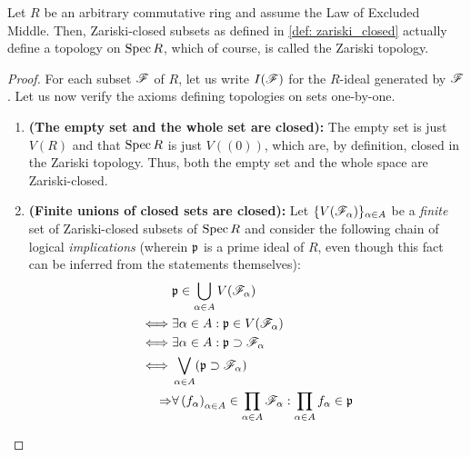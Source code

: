             \begin{proposition} \label{prop: zariski_closed_well_definiteness}
                Let $R$ be an arbitrary commutative ring and assume the Law of Excluded Middle. Then, Zariski-closed subsets as defined in \ref{def: zariski_closed} actually define a topology on $\Spec R$, which of course, is called the Zariski topology.
            \end{proposition}
                \begin{proof}
                    For each subset $\scrF$ of $R$, let us write $I(\scrF)$ for the $R$-ideal generated by $\scrF$. Let us now verify the axioms defining topologies on sets one-by-one.
                        \begin{enumerate}
                            \item \textbf{(The empty set and the whole set are closed):} The empty set is just $V(R)$ and that $\Spec R$ is just $V\left((0)\right)$, which are, by definition, closed in the Zariski topology. Thus, both the empty set and the whole space are Zariski-closed.
                            \item \textbf{(Finite unions of closed sets are closed):} Let $\{V(\scrF_{\alpha})\}_{\alpha \in A}$ be a \textit{finite} set of Zariski-closed subsets of $\Spec R$ and consider the following chain of logical \textit{implications} (wherein $\p$ is a prime ideal of $R$, even though this fact can be inferred from the statements themselves):
                                $$
                                    \begin{aligned}
                                        & \p \in \bigcup_{\alpha \in A} V(\scrF_{\alpha})
                                        \\
                                        \iff & \exists \alpha \in A: \p \in V(\scrF_{\alpha})
                                        \\
                                        \iff & \exists \alpha \in A: \p \supset \scrF_{\alpha}
                                        \\
                                        \iff & \bigvee_{\alpha \in A} (\p \supset \scrF_{\alpha})
                                        \\
                                        \implies & \forall \left(f_{\alpha}\right)_{\alpha \in A} \in \prod_{\alpha \in A} \scrF_{\alpha}: \prod_{\alpha \in A} f_{\alpha} \in \p
                                        \\

\end{aligned}$$
\end{enumerate}
\end{proof}
